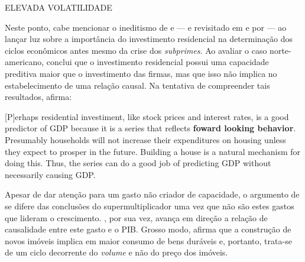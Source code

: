 ELEVADA VOLATILIDADE

Neste ponto, cabe mencionar o ineditismo de \textcite{green_follow_1997} e \textcite{leamer_housing_2007} --- e revisitado em \textcite{leamer_housing_2015} e por \textcite{fiebiger_trend_2017} --- ao lançar luz sobre a importância do investimento residencial na determinação dos ciclos econômicos antes mesmo da crise dos \textit{subprimes}. 
Ao avaliar o caso norte-americano, \textcite{green_follow_1997} conclui que o investimento residencial possui uma capacidade preditiva maior que o investimento das firmas, mas que isso não implica no estabelecimento de uma relação causal. Na tentativa de compreender tais resultados, afirma:

\begin{citacao}
	
	[P]erhaps residential investiment, like stock prices and interest rates, is a good predictor of GDP because it is a series that reflects \textbf{foward looking behavior}. Presumably households will not increase their expenditures on housing unless they expect to prosper in the future. Building a house is a natural mechanism for doing this. Thus, the series can do a good job of predicting GDP without necessarily causing GDP.
	\cite[p.~267, grifos adicionados]{green_follow_1997}
\end{citacao}
Apesar de dar atenção para um gasto não criador de capacidade, o argumento de \textcite{green_follow_1997} se difere das conclusões do supermultiplicador uma vez que não são estes gastos que lideram o crescimento.
\textcite{leamer_housing_2007}, por sua vez, avança em direção a relação de causalidade entre este gasto e o PIB. Grosso modo, afirma que a construção de novos imóveis implica em maior consumo de bens duráveis e, portanto, trata-se de um ciclo decorrente do \textit{volume} e não do preço dos imóveis. 

